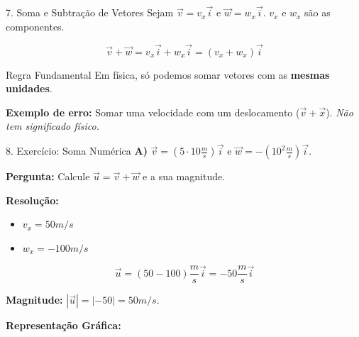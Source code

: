 \documentclass{beamer}
\begin{document}
	\begin{frame}{7. Soma e Subtração de Vetores}
		Sejam $\vec{v} = v_x \vec{i}$ e $\vec{w} = w_x \vec{i}$.
		$v_x$ e $w_x$ são as componentes.
		
		$$ \vec{v} + \vec{w} = v_x \vec{i} + w_x \vec{i} = (v_x + w_x) \vec{i} $$
		
		\begin{alertblock}{Regra Fundamental}
			Em física, só podemos somar vetores com as \textbf{mesmas unidades}.
		\end{alertblock}
		
		\textbf{Exemplo de erro:}
		Somar uma velocidade com um deslocamento ($\vec{v} + \vec{x}$).
		\textit{Não tem significado físico.}
	\end{frame}
	
	\begin{frame}{8. Exercício: Soma Numérica}
		\textbf{A)}
		$\vec{v} = (5 \cdot 10 \frac{m}{s}) \vec{i}$ e $\vec{w} = -(10^2 \frac{m}{s}) \vec{i}$.
		
		\textbf{Pergunta:} Calcule $\vec{u} = \vec{v} + \vec{w}$ e a sua magnitude.
		
		\textbf{Resolução:}
		\begin{itemize}
			\item $v_x = 50 m/s$
			\item $w_x = -100 m/s$
		\end{itemize}
		
		$$ \vec{u} = (50 - 100) \frac{m}{s} \vec{i} = -50 \frac{m}{s} \vec{i} $$
		
		\textbf{Magnitude:} $|\vec{u}| = |-50| = 50 m/s$.
		
		\vspace{0.3cm}
		\textbf{Representação Gráfica:}
		\begin{center}
		\end{center}
	\end{frame}
	
\end{document}

